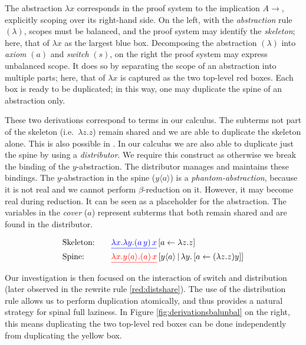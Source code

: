 \documentclass[runningheads]{llncs}
\newcommand\imp{\mathbin\rightarrow}
\newcommand\red{\color{red}}
\newcommand\blue{\color{blue}}
\begin{document}
The abstraction $\lambda x$ corresponds in the proof system to the implication $A\imp$, explicitly scoping over its right-hand side. On the left, with the \emph{abstraction} rule $(\lambda)$, scopes must be balanced, and the proof system may identify the \emph{skeleton}; here, that of $\lambda x$ as the largest blue box. Decomposing the abstraction $(\lambda)$ into \emph{axiom} $(a)$ and \emph{switch} $(s)$, on the right the proof system may express unbalanced scope. It does so by separating the scope of an abstraction into multiple parts; here, that of $\lambda x$ is captured as the two top-level red boxes. Each box is ready to be duplicated; in this way, one may duplicate the spine of an abstraction only.

These two derivations correspond to terms in our calculus. The subterms not part of the skeleton (i.e.\ $\lambda z . z$) remain shared and we are able to duplicate the skeleton alone. This is also possible in \cite{Gundersen-Heijltjes-Parigot-2013-LICS}. In our calculus we are also able to duplicate just the spine by using a \emph{distributor}. We require this construct as otherwise we break the binding of the $y$-abstraction. The distributor manages and maintains these bindings. The $y$-abstraction in the spine ($y \langle a \rangle$) is a \emph{phantom-abstraction}, because it is not real and we cannot perform $\beta$-reduction on it. However, it may become real during reduction. It can be seen as a placeholder for the abstraction. The variables in the \emph{cover} ($a$) represent subterms that both remain shared and are found in the distributor.

\[
\begin{array}{l@{\qquad}l}
		\text{Skeleton:} & {\blue\underline{\lambda x. \lambda y. (a\,y)\,x}}\, [a \leftarrow \lambda z . z]
\\[5pt]	\text{Spine:}	 &  {\red\underline{\lambda x. y\langle a\rangle. (a)\,x}}\, [y \langle a \rangle \, \vert\, \lambda y . \,  [a \leftarrow (\lambda z . z)y ]]
\end{array}
\]


Our investigation is then focused on the interaction of switch and distribution (later observed in the rewrite rule \ref{red:distshare}). The use of the distribution rule allows us to perform duplication atomically, and thus provides a natural strategy for spinal full laziness. In Figure \ref{fig:derivationsbalunbal} on the right, this means duplicating the two top-level red boxes can be done independently from duplicating the yellow box.
\end{document}
